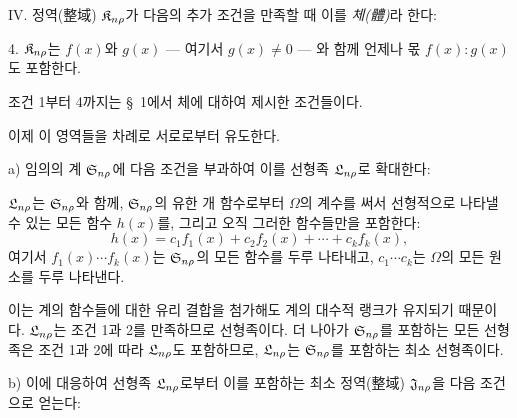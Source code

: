 IV. 정역(整域) $\mathfrak K_{n\rho}$가 다음의 추가 조건을 만족할 때 이를 \emph{체(體)}라 한다:

4. $\mathfrak K_{n\rho}$는 $f(x)$와 $g(x)$ --- 여기서 $g(x)\ne0$ --- 와 함께 언제나 몫 $f(x):g(x)$도 포함한다.

조건 1부터 4까지는 \S\ 1에서 체에 대하여 제시한 조건들이다.

이제 이 영역들을 차례로 서로로부터 유도한다.

a) 임의의 계 $\mathfrak S_{n\rho}$에 다음 조건을 부과하여 이를 선형족 $\mathfrak L_{n\rho}$로 확대한다:

$\mathfrak L_{n\rho}$는 $\mathfrak S_{n\rho}$와 함께, $\mathfrak S_{n\rho}$의 유한 개 함수로부터 $\Omega$의 계수를 써서 선형적으로 나타낼 수 있는 모든 함수 $h(x)$를, 그리고 오직 그러한 함수들만을 포함한다:
\[
h(x)=c_1f_1(x)+c_2f_2(x)+\cdots+c_kf_k(x),
\]
여기서 $f_1(x)\cdots f_k(x)$는 $\mathfrak S_{n\rho}$의 모든 함수를 두루 나타내고, $c_1\cdots c_k$는 $\Omega$의 모든 원소를 두루 나타낸다.

이는 계의 함수들에 대한 유리 결합을 첨가해도 계의 대수적 랭크가 유지되기 때문이다. $\mathfrak L_{n\rho}$는 조건 1과 2를 만족하므로 선형족이다. 더 나아가 $\mathfrak S_{n\rho}$를 포함하는 모든 선형족은 조건 1과 2에 따라 $\mathfrak L_{n\rho}$도 포함하므로, $\mathfrak L_{n\rho}$는 $\mathfrak S_{n\rho}$를 포함하는 최소 선형족이다.

b) 이에 대응하여 선형족 $\mathfrak L_{n\rho}$로부터 이를 포함하는 최소 정역(整域) $\mathfrak J_{n\rho}$을 다음 조건으로 얻는다:

